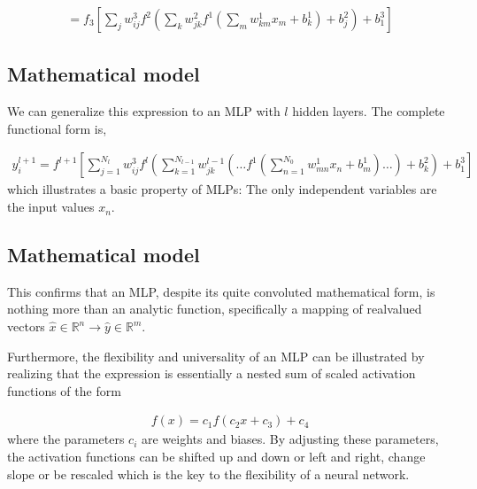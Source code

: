 \documentclass[letterpaper,10pt,english]{sphinxmanual}
\begin{document}
\begin{equation*}
\begin{split}
\begin{equation} 
 = f_3\left[\sum_{j} w_{ij}^3 f^2\left(\sum_{k} w_{jk}^2 f^1\left(\sum_{m} w_{km}^1 x_m + b_k^1\right) + b_j^2\right)
  + b_1^3\right]
\label{_auto4} \tag{8}
\end{equation}
\end{split}
\end{equation*}

\subsection{Mathematical model}
\label{\detokenize{chapter6:id3}}
We can generalize this expression to an MLP with \(l\) hidden
layers. The complete functional form is,




\begin{equation*}
\begin{split}
\begin{equation}
y^{l+1}_i = f^{l+1}\left[\!\sum_{j=1}^{N_l} w_{ij}^3 f^l\left(\sum_{k=1}^{N_{l-1}}w_{jk}^{l-1}\left(\dots f^1\left(\sum_{n=1}^{N_0} w_{mn}^1 x_n+ b_m^1\right)\dots\right)+b_k^2\right)+b_1^3\right] 
\label{completeNN} \tag{9}
\end{equation}
\end{split}
\end{equation*}
which illustrates a basic property of MLPs: The only independent
variables are the input values \(x_n\).


\subsection{Mathematical model}
\label{\detokenize{chapter6:id4}}
This confirms that an MLP, despite its quite convoluted mathematical
form, is nothing more than an analytic function, specifically a
mapping of real\sphinxhyphen{}valued vectors \(\hat{x} \in \mathbb{R}^n \rightarrow
\hat{y} \in \mathbb{R}^m\).

Furthermore, the flexibility and universality of an MLP can be
illustrated by realizing that the expression is essentially a nested
sum of scaled activation functions of the form




\begin{equation*}
\begin{split}
\begin{equation}
 f(x) = c_1 f(c_2 x + c_3) + c_4
\label{_auto5} \tag{10}
\end{equation}
\end{split}
\end{equation*}
where the parameters \(c_i\) are weights and biases. By adjusting these
parameters, the activation functions can be shifted up and down or
left and right, change slope or be rescaled which is the key to the
flexibility of a neural network.
\end{document}

